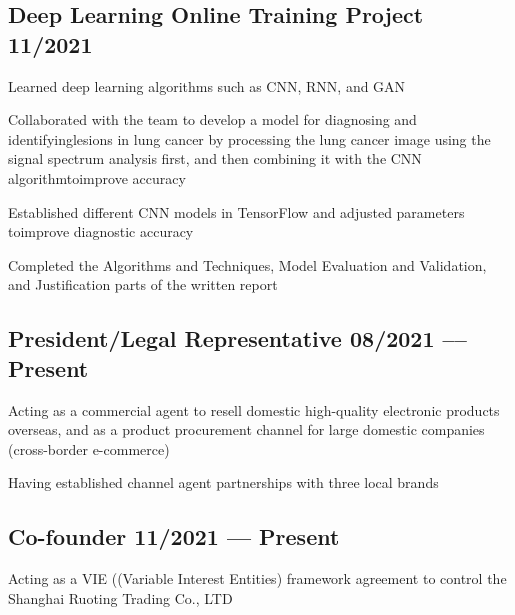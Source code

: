 \documentclass[letter,10pt]{article}
\begin{document}
\subsection{{Deep Learning Online Training Project \hfill 11/2021}}
\begin{zitemize}
\item Learned deep learning algorithms such as CNN, RNN, and GAN
\item Collaborated with the team to develop a model for diagnosing and identifyinglesions in lung cancer by processing the lung cancer image using the signal spectrum analysis first, and then combining it with the CNN algorithmtoimprove accuracy
\item Established different CNN models in TensorFlow and adjusted parameters toimprove diagnostic accuracy
\item Completed the Algorithms and Techniques, Model Evaluation and Validation, and Justification parts of the written report
\end{zitemize}

\subsection{{President/Legal Representative \hfill 08/2021 –-- Present}}
\begin{zitemize}
\item Acting as a commercial agent to resell domestic high-quality electronic products overseas, and as a product procurement channel for large domestic companies (cross-border e-commerce)
\item Having established channel agent partnerships with three local brands
\end{zitemize}

\subsection{{Co-founder \hfill 11/2021 –-- Present}}
\begin{zitemize}
\item Acting as a VIE ((Variable Interest Entities) framework agreement to control the Shanghai Ruoting Trading Co., LTD
\end{zitemize}
\end{document}
